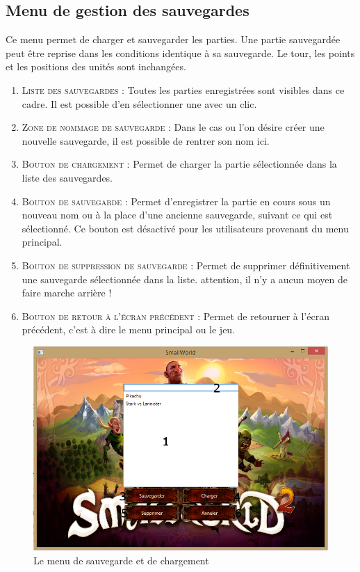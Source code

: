 	\subsection{Menu de gestion des sauvegardes}
		\label{subsec:sauvergardes}
		Ce menu permet de charger et sauvegarder les parties. Une partie sauvegardée peut être reprise dans les conditions identique à sa sauvegarde. Le tour, les points et les positions des unités sont inchangées.
		\begin{enumerate}
			\item \textsc{Liste des sauvegardes} : Toutes les parties enregistrées sont visibles dans ce cadre. Il est possible d'en sélectionner une avec un clic.
			\item \textsc{Zone de nommage de sauvegarde} : Dans le cas ou l'on désire créer une nouvelle sauvegarde, il est possible de rentrer son nom ici.
			\item \textsc{Bouton de chargement} : Permet de charger la partie sélectionnée dans la liste des sauvegardes.
			\item \textsc{Bouton de sauvegarde} : Permet d'enregistrer la partie en cours sous un nouveau nom ou à la place d'une ancienne sauvegarde, suivant ce qui est sélectionné. 
					Ce bouton est désactivé pour les utilisateurs provenant du menu principal.
			\item \textsc{Bouton de suppression de sauvegarde} : Permet de supprimer définitivement une sauvegarde sélectionnée dans la liste. attention, il n'y a aucun moyen de faire marche arrière !
			\item \textsc{Bouton de retour à l'écran précédent} : Permet de retourner à l'écran précédent, c'est à dire le menu principal ou le jeu.	
		\end{enumerate}
		
		\begin{figure}[h!]
			\caption{Le menu de sauvegarde et de chargement}
			\label{fig:menuCreat}
			\centering
			\includegraphics[width=\textwidth]{res/save_menu_annot}
		\end{figure}
		
